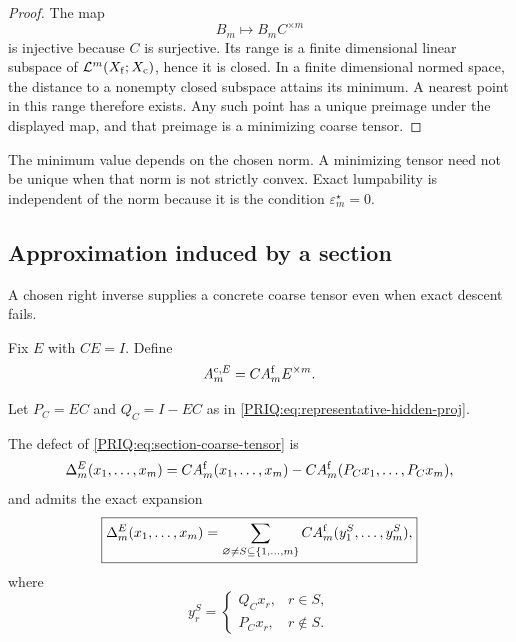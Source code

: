 \begin{proof}
The map
\[
  B_m\longmapsto B_mC^{\times m}
\]
is injective because $C$ is surjective.  Its range is a finite dimensional linear subspace of $\mathcal L^m(X_{\mathrm f};X_{\mathrm c})$, hence it is closed.  In a finite dimensional normed space, the distance to a nonempty closed subspace attains its minimum.  A nearest point in this range therefore exists.  Any such point has a unique preimage under the displayed map, and that preimage is a minimizing coarse tensor.
\end{proof}

The minimum value depends on the chosen norm.  A minimizing tensor need not be unique when that norm is not strictly convex.  Exact lumpability is independent of the norm because it is the condition $\varepsilon_m^\star=0$.

\subsection{Approximation induced by a section}
A chosen right inverse supplies a concrete coarse tensor even when exact descent fails.

\begin{PRIQdefinition}\label{PRIQ:def:section-coarse-tensor}
Fix $E$ with $CE=I$.  Define
\begin{equation}\label{PRIQ:eq:section-coarse-tensor}
  A_m^{\mathrm c,E}
  =
  CA_m^{\mathrm f}E^{\times m}.
\end{equation}
\end{PRIQdefinition}

Let $P_C=EC$ and $Q_C=I-EC$ as in \eqref{PRIQ:eq:representative-hidden-proj}.

\begin{PRIQproposition}\label{PRIQ:prop:hidden-slot-expansion}
The defect of \eqref{PRIQ:eq:section-coarse-tensor} is
\begin{equation}\label{PRIQ:eq:section-defect}
  \Delta_m^E(x_1,\ldots,x_m)
  =
  CA_m^{\mathrm f}(x_1,\ldots,x_m)
  -
  CA_m^{\mathrm f}(P_Cx_1,\ldots,P_Cx_m),
\end{equation}
and admits the exact expansion
\begin{equation}\label{PRIQ:eq:hidden-slot-sum}
  \boxed{
  \Delta_m^E(x_1,\ldots,x_m)
  =
  \sum_{\varnothing\neq S\subseteq\{1,\ldots,m\}}
  CA_m^{\mathrm f}(y_1^S,\ldots,y_m^S),}
\end{equation}
where
\[
  y_r^S=
  \begin{cases}
  Q_Cx_r,&r\in S,\\
  P_Cx_r,&r\notin S.
  \end{cases}
\]
\end{PRIQproposition}

